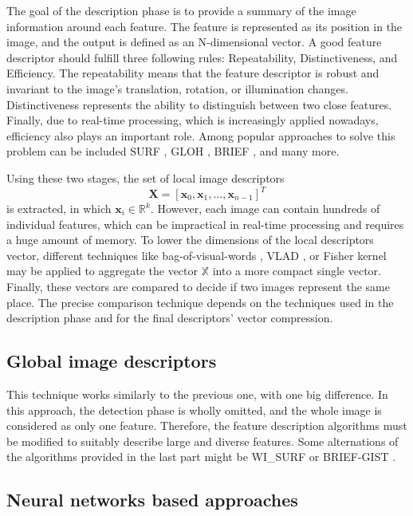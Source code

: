 The goal of the description phase is to provide a summary of the image information around each feature. The feature is represented as its position in the image, and the output is defined as an N-dimensional vector. A good feature descriptor should fulfill three following rules: Repeatability, Distinctiveness, and Efficiency. The repeatability means that the feature descriptor is robust and invariant to the image's translation, rotation, or illumination changes. Distinctiveness represents the ability to distinguish between two close features. Finally, due to real-time processing, which is increasingly applied nowadays, efficiency also plays an important role. Among popular approaches to solve this problem can be included SURF \parencite{SURF}, GLOH \parencite{GLOH}, BRIEF \parencite{BRIEF}, and many more.\par
Using these two stages, the set of local image descriptors
$$
    \mathbf{X} = [\mathbf{x}_0, \mathbf{x}_1, \dots, \mathbf{x}_{n-1}]^T
$$
is extracted, in which $\textbf{x}_i \in \mathbb{R}^k$. However, each image can contain hundreds of individual features, which can be impractical in real-time processing and requires a huge amount of memory. To lower the dimensions of the local descriptors vector, different techniques like bag-of-visual-words \parencite{BagOfVisualWords1}\parencite{BagOfVisualWords2}, VLAD \parencite{VLAD}, or Fisher kernel \parencite{FisherKernel} may be applied to aggregate the vector $\mathbb{X}$ into a more compact single vector. Finally, these vectors are compared to decide if two images represent the same place. The precise comparison technique depends on the techniques used in the description phase and for the final descriptors' vector compression.

\subsection{Global image descriptors}\label{section:globalImageDescriptors}

This technique works similarly to the previous one, with one big difference. In this approach, the detection phase is wholly omitted, and the whole image is considered as only one feature. Therefore, the feature description algorithms must be modified to suitably describe large and diverse features. Some alternations of the algorithms provided in the last part might be WI\_SURF \parencite{WiSurf} or BRIEF-GIST \parencite{BRIEFGIST}.

\subsection{Neural networks based approaches}\label{section:neuralNetworksBasedApproaches}

